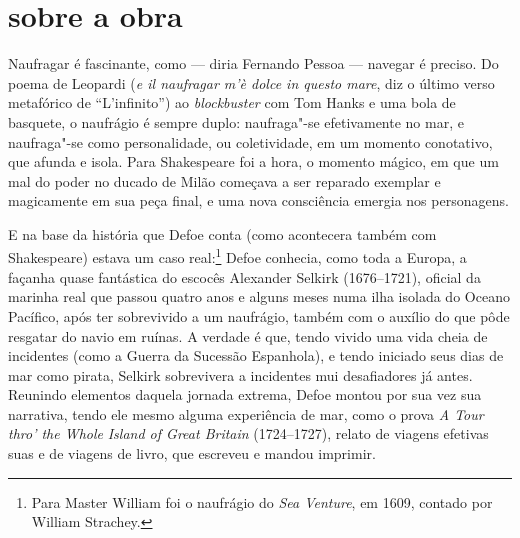 \section{sobre a obra}

Naufragar é fascinante, como --- diria Fernando Pessoa --- navegar é
preciso. Do poema de Leopardi (\emph{e il naufragar m'è dolce in questo
mare}, diz o último verso metafórico de ``L'infinito'') ao
\emph{blockbuster} com Tom Hanks e uma bola de basquete, o naufrágio é
sempre duplo: naufraga"-se efetivamente no mar, e naufraga"-se como
personalidade, ou coletividade, em um momento conotativo, que afunda e
isola. Para Shakespeare foi a hora, o momento mágico, em que um mal do
poder no ducado de Milão começava a ser reparado exemplar e magicamente
em sua peça final, e uma nova consciência emergia nos personagens.

E na base da história que Defoe conta (como acontecera também com
Shakespeare) estava um caso real:\footnote{Para Master William foi o
  naufrágio do \emph{Sea Venture}, em 1609, contado por William
  Strachey.} Defoe conhecia, como toda a Europa, a façanha quase
fantástica do escocês Alexander Selkirk (1676--1721), oficial da marinha
real que passou quatro anos e alguns meses numa ilha isolada do Oceano
Pacífico, após ter sobrevivido a um naufrágio, também com o auxílio do
que pôde resgatar do navio em ruínas. A verdade é que, tendo vivido uma
vida cheia de incidentes (como a Guerra da Sucessão Espanhola), e tendo
iniciado seus dias de mar como pirata, Selkirk sobrevivera a incidentes
mui desafiadores já antes. Reunindo elementos daquela jornada extrema,
Defoe montou por sua vez sua narrativa, tendo ele mesmo alguma
experiência de mar, como o prova \emph{A Tour thro' the Whole}
\emph{Island of Great Britain} (1724--1727), relato de viagens efetivas
suas e de viagens de livro, que escreveu e mandou imprimir.

